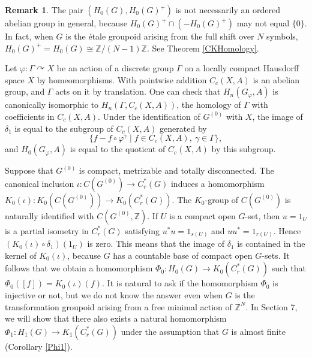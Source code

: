 \documentclass[11pt]{article}
\theoremstyle{definition}
\newtheorem{rem}[thm]{Remark}
\renewcommand{\phi}{\varphi}
\newcommand{\Z}{\mathbb{Z}}
\begin{document}
\begin{rem}
The pair $(H_0(G),H_0(G)^+)$ is not necessarily an ordered abelian group 
in general, 
because $H_0(G)^+\cap({-}H_0(G)^+)$ may not equal $\{0\}$. 
In fact, 
when $G$ is the \'etale groupoid arising from the full shift over $N$ symbols, 
$H_0(G)^+=H_0(G)\cong\Z/(N{-}1)\Z$. 
See Theorem \ref{CKHomology}. 
\end{rem}

Let $\phi:\Gamma\curvearrowright X$ be an action of 
a discrete group $\Gamma$ on a locally compact Hausdorff space $X$ 
by homeomorphisms. 
With pointwise addition $C_c(X,A)$ is an abelian group, 
and $\Gamma$ acts on it by translation. 
One can check that 
$H_n(G_\phi,A)$ is canonically isomorphic to $H_n(\Gamma,C_c(X,A))$, 
the homology of $\Gamma$ with coefficients in $C_c(X,A)$. 
Under the identification of $G^{(0)}$ with $X$, 
the image of $\delta_1$ is equal to the subgroup of $C_c(X,A)$ 
generated by 
\[
\{f-f\circ\phi^\gamma\mid f\in C_c(X,A), \ \gamma\in\Gamma\}, 
\]
and $H_0(G_\phi,A)$ is equal to the quotient of $C_c(X,A)$ by this subgroup. 

Suppose that $G^{(0)}$ is compact, metrizable and totally disconnected. 
The canonical inclusion $\iota:C(G^{(0)})\to C^*_r(G)$ induces 
a homomorphism $K_0(\iota):K_0(C(G^{(0)}))\to K_0(C^*_r(G))$. 
The $K_0$-group of $C(G^{(0)})$ is naturally identified with $C(G^{(0)},\Z)$. 
If $U$ is a compact open $G$-set, 
then $u=1_U$ is a partial isometry in $C^*_r(G)$ 
satisfying $u^*u=1_{s(U)}$ and $uu^*=1_{r(U)}$. 
Hence $(K_0(\iota)\circ\delta_1)(1_U)$ is zero. 
This means that 
the image of $\delta_1$ is contained in the kernel of $K_0(\iota)$, 
because $G$ has a countable base of compact open $G$-sets. 
It follows that 
we obtain a homomorphism $\Phi_0:H_0(G)\to K_0(C^*_r(G))$ 
such that $\Phi_0([f])=K_0(\iota)(f)$. 
It is natural to ask if the homomorphism $\Phi_0$ is injective or not, 
but we do not know the answer 
even when $G$ is the transformation groupoid arising from 
a free minimal action of $\Z^N$. 
In Section 7, we will show that 
there also exists a natural homomorphism $\Phi_1:H_1(G)\to K_1(C^*_r(G))$ 
under the assumption that $G$ is almost finite (Corollary \ref{Phi1}). 
\end{document}
